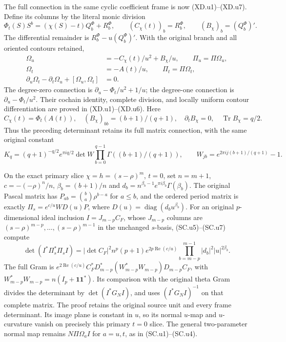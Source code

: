 The full connection in the same cyclic coefficient frame is
now (XD.u1)--(XD.u7).  Define its columns by the literal monic
division
\[
 \Phi_t(S)S^b=(\chi(S)-t)Q_b^\Phi+R_b^\Phi,\qquad
 (C_\chi(t))_b=R_b^\Phi,\qquad (B_\chi)_b=(Q_b^\Phi)' .
\]
The differential remainder is \(R_b^\Phi-u(Q_b^\Phi)'\).
With the original branch and all oriented contours retained,
\[
 \begin{aligned}
 \Omega_u&=-C_\chi(t)/u^2+B_\chi/u,\qquad
 \Pi_u=\Pi\Omega_u,\\
 \Omega_t&=-A(t)/u,\qquad \Pi_t=\Pi\Omega_t,\\
 \partial_u\Omega_t-\partial_t\Omega_u+
                          [\Omega_u,\Omega_t]&=0 .
 \end{aligned}
\]
The degree-zero connection is
\(\partial_u-\Phi_t/u^2+1/u\); the degree-one connection is
\(\partial_u-\Phi_t/u^2\).  Their cochain identity, complete
division, and locally uniform contour differentiation are proved
in (XD.u1)--(XD.u6).  Here
\[
 C_\chi(t)=\Phi_t(A(t)),\quad
 (B_\chi)_{bb}=(b+1)/(q+1),\quad
 \partial_tB_\chi=0,\quad \operatorname{Tr}B_\chi=q/2.
\]
Thus the preceding determinant retains its full matrix
connection, with the same original constant
\[
 K_q=(q+1)^{-q/2}e^{\pi iq/2}\det W
          \prod_{b=0}^{q-1}\Gamma((b+1)/(q+1)),\qquad
 W_{jb}=e^{2\pi i j(b+1)/(q+1)}-1.
\]

On the exact primary slice \(\chi=h=(s-\rho)^m\), \(t=0\),
set \(n=m+1\), \(c=-(-\rho)^n/n\),
\(\beta_b=(b+1)/n\) and
\(d_b=n^{\beta_b-1}e^{\pi i\beta_b}\Gamma(\beta_b)\).
The original Pascal matrix has
\(P_{ab}=\binom ba\rho^{b-a}\) for \(a\le b\), and
the ordered period matrix is exactly
\(\Pi_s=e^{c/u}WD(u)P\), where
\(D(u)=\operatorname{diag}(d_bu^{\beta_b})\).
For an original \(p\)-dimensional ideal inclusion
\(I=J_{m-p}C_F\), whose \(J_{m-p}\) columns are
\((s-\rho)^{m-p},\ldots,(s-\rho)^{m-1}\) in the unchanged
\(s\)-basis, (SC.u5)--(SC.u7) compute
\[
 \det(I^*\Pi_s^*\Pi_s I)
 =|\det C_F|^2n^p(p+1)e^{2p\operatorname{Re}(c/u)}
                \prod_{b=m-p}^{m-1}|d_b|^2|u|^{2\beta_b}.
\]
The full Gram is
\(e^{2\operatorname{Re}(c/u)}
C_F^*D_{m-p}^*(W_{m-p}^*W_{m-p})D_{m-p}C_F\), with
\(W_{m-p}^*W_{m-p}=n(I_p+\mathbf1\mathbf1^*)\).
Its comparison with the original theta Gram divides the
determinant by \(\det(I^*G_NI)\), and uses
\((I^*G_NI)^{-1}\) on that complete matrix.
The proof retains the original source unit and every frame
determinant.  Its image plane is constant in \(u\), so its normal
\(u\)-map and \(u\)-curvature vanish on precisely this primary
\(t=0\) slice.  The general two-parameter normal map remains
\(N\Pi\Omega_a I\) for \(a=u,t\), as in (SC.u1)--(SC.u4).

